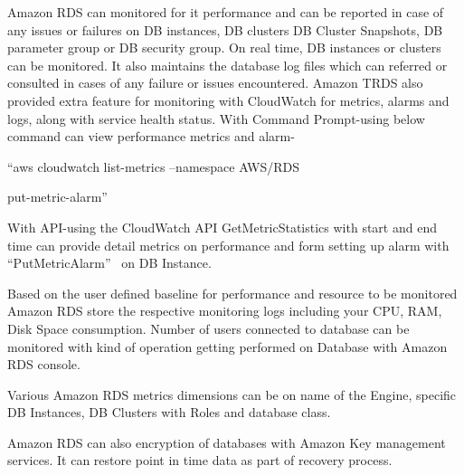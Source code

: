Amazon RDS can monitored for it performance and can be reported in case of 
any issues or failures on DB instances, DB clusters DB Cluster Snapshots, DB 
parameter group or DB security group.
On real time, DB instances or clusters can be monitored. It also maintains the 
database log files which can referred or consulted in cases of any failure or 
issues encountered.  
Amazon TRDS also provided extra feature for monitoring with CloudWatch for 
metrics, alarms and logs, along with service health status.
With Command Prompt-using below command can view performance metrics and 
alarm- 

``aws cloudwatch list-metrics --namespace AWS/RDS

put-metric-alarm''~\cite{hid-sp18-520-amardsmon}

With API-using the CloudWatch API GetMetricStatistics with start and end time 
can provide detail metrics on performance and form setting up alarm 
with ``PutMetricAlarm''~\cite{hid-sp18-520-amardsmon} on DB Instance.

Based on the user defined baseline for performance and resource to be monitored 
Amazon RDS store the respective monitoring logs including your CPU, RAM, Disk 
Space consumption.
Number of users connected to database can be monitored with kind of operation 
getting performed on Database with Amazon RDS console.  

Various Amazon RDS metrics dimensions can be on name of the Engine, specific 
DB Instances, DB Clusters with Roles and database class.

Amazon RDS can also encryption of databases with Amazon Key management services. It can restore point in time data as part of recovery process.

